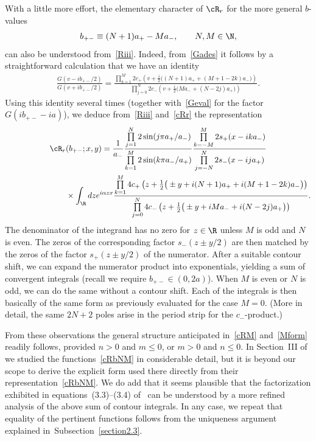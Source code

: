 \documentclass[pdftex]{sigma}
\numberwithin{equation}{section}
\begin{document}
With a little more ef\/fort, the elementary character of $\cR_r$ for the more general $b$-values
\begin{gather}\label{bNM}
b_{+-}\equiv (N+1)a_{+}-Ma_-,\qquad N,M\in\N,
\end{gather}
can also be understood from~\eqref{Riii}. Indeed, from~\eqref{Gades} it follows by a straightforward calculation that we have an identity
\begin{gather}\label{GbNM}
\frac{G(v-ib_{+-}/2)}{G(v+ib_{+-}/2)}=\frac{\prod\limits_{k=1}^M2c_+\left(v+\frac{i}{2}\big( (N+1)a_+ +(M+1-2k)a_-\big)\right)}{\prod\limits_{j=0}^N2c_-\left(v+\frac{i}{2}\big( Ma_- +(N-2j)a_+\big)\right)}.
\end{gather}
Using this identity several times (together with~\eqref{Geval} for the factor $G(ib_{+-}-ia)$), we deduce from~\eqref{Riii} and~\eqref{cRr} the representation
\begin{gather}
   \cR_r(b_{+-};x,y)=\frac{1}{a_-}\frac{\prod\limits_{j=1}^N 2\sin(j\pi a_+/a_-)}{\prod\limits_{k=1}^M 2\sin(k\pi a_-/a_+)}
\frac{\prod\limits_{k=-M}^M2s_+(x-ika_-)}{\prod\limits_{j=-N}^N2s_-(x-ija_+)}\label{cRbNM}
 \\
\phantom{\cR_r(b_{+-};x,y)=}{}   \times
\int_{\R}dze^{i\alpha zx}\frac{\prod\limits_{k=1}^M4c_+\left(z+\frac{1}{2}\big(\pm y+i(N+1)a_++i(M+1-2k)a_-\big)\right)}{\prod\limits_{j=0}^N4c_-\left(z+\frac{1}{2}\big(\pm y+iMa_-+i(N-2j)a_+\big)\right)}.\nonumber
\end{gather}
The denominator of the integrand has no zero for $z\in\R$ unless $M$ is odd and $N$ is even. The zeros of the corresponding factor $s_-(z\pm y/2)$ are then matched by the zeros of the factor $s_+(z\pm y/2)$ of the numerator. After a suitable contour shift, we can expand the numerator product into exponentials, yielding a sum of convergent integrals (recall we require $b_{+-}\in(0,2a)$). When $M$ is even or $N$ is odd, we can do the same without a contour shift. Each of the integrals is then basically of the same form as previously evaluated for the case $M=0$. (More in detail, the same $2N+2$ poles arise in the period strip  for the $c_-$-product.)

From these observations the general structure anticipated in~\eqref{cRM} and~\eqref{Mform} readily follows, provided $n>0$ and $m\le 0$, or $m>0$ and $n\le 0$. In Section~III of~\cite{GLFII} we studied the functions~\eqref{cRbNM} in considerable detail, but it is beyond our scope to derive the explicit form used there directly from their representation~\eqref{cRbNM}. We do add that it seems plausible that the factorization exhibited in equations~(3.3)--(3.4) of~\cite{GLFII} can be understood by a more ref\/ined analysis of the above sum of contour integrals. In any case, we repeat that equality of the pertinent functions follows from the uniqueness argument explained in~Subsection~\ref{section2.3}.
\end{document}
